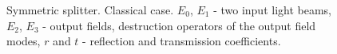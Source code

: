\begin{figure}
\centering



\caption{Symmetric splitter. Classical case.
  $E_0$, $E_1$ - two input light beams,
  $E_2$, $E_3$ - output fields, destruction operators 
  of the output field modes, $r$ and $t$ - reflection and transmission coefficients.}
\label{figPart2Interfero_1ex}
\end{figure}